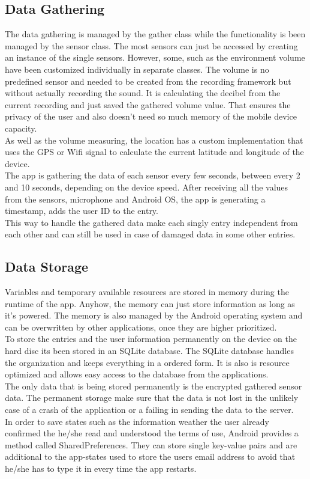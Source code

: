 \subsection{Data Gathering}
The data gathering is managed by the gather class while the functionality is been managed by the sensor class. The most sensors can just be accessed by creating an instance of the single sensors. However, some, such as the environment volume have been customized individually in separate classes. The volume is no predefined sensor and needed to be created from the recording framework but without actually recording the sound. It is calculating the decibel from the current recording and just saved the gathered volume value. That ensures the privacy of the user and also doesn't need so much memory of the mobile device capacity.\\
As well as the volume measuring, the location has a custom implementation that uses the GPS or Wifi signal to calculate the current latitude and longitude of the device. \\
The app is gathering the data of each sensor every few seconds, between every 2 and 10 seconds, depending on the device speed. After receiving all the values from the sensors, microphone and Android OS, the app is generating a timestamp, adds the user ID to the entry.\\
This way to handle the gathered data make each singly entry independent from each other and can still be used in case of damaged data in some other entries. 

\subsection{Data Storage}
Variables and temporary available resources are stored in memory during the runtime of the app. Anyhow, the memory can just store information as long as it's powered. The memory is also managed by the Android operating system and can be overwritten by other applications, once they are higher prioritized.\\
To store the entries and the user information permanently on the device on the hard disc its been stored in an SQLite database. The SQLite database handles the organization and keeps everything in a ordered form. It is also is resource optimized and allows easy access to the database from the applications.\\
The only data that is being stored permanently is the encrypted gathered sensor data. The permanent storage make sure that the data is not lost in the unlikely case of a crash of the application or a failing in sending the data to the server.\\
In order to save states such as the information weather the user already confirmed the he/she read and understood the terms of use, Android provides a method called SharedPreferences. They can store single key-value pairs and are additional to the app-states used to store the users email address to avoid that he/she has to type it in every time the app restarts. 

